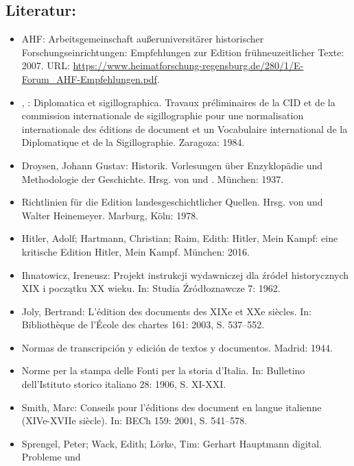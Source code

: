 \documentclass{article}
\begin{document}
        \subsection*{Literatur:}\begin{itemize}\item AHF: Arbeitsgemeinschaft außeruniversitärer historischer
                              Forschungseinrichtungen: Empfehlungen zur Edition frühneuzeitlicher
                              Texte: 2007. URL: \url{https://www.heimatforschung-regensburg.de/280/1/E-Forum_AHF-Empfehlungen.pdf}.\item , : Diplomatica et sigillographica. Travaux préliminaires de
                              la CID et de la commission internationale de sigillographie pour une
                              normalisation internationale des éditions de document et un
                              Vocabulaire international de la Diplomatique et de la
                              Sigillographie. Zaragoza: 1984.\item Droysen, Johann Gustav: Historik. Vorlesungen über Enzyklopädie und Methodologie
                              der Geschichte. Hrsg. von  und  . München: 1937.\item Richtlinien für die Edition landesgeschichtlicher
                              Quellen. Hrsg. von  und Walter Heinemeyer. Marburg, Köln: 1978.\item Hitler, Adolf; Hartmann, Christian; Raim, Edith: Hitler, Mein Kampf: eine kritische Edition Hitler, Mein Kampf. München: 2016.\item Ihnatowicz, Ireneusz: Projekt instrukcji wydawniczej dla źródeł historycznych
                              XIX i początku XX wieku. In: Studia Źródłoznawcze 7: 1962.\item Joly, Bertrand: L’édition des documents des XIXe et XXe siècles. In: Bibliothèque de l'École des chartes 161: 2003, S. 537–552.\item Normas de transcripción y edición de textos y
                              documentos. Madrid: 1944.\item Norme per la stampa delle Fonti per la storia
                              d'Italia. In: Bulletino dell'Istituto storico italiano 28: 1906, S. XI-XXI.\item Smith, Marc: Conseils pour l'éditions des document en langue
                              italienne (XIVe-XVIIe siècle). In: BECh 159: 2001, S. 541–578.\item Sprengel, Peter; Wack, Edith; Lörke, Tim: Gerhart Hauptmann digital. Probleme und

\end{itemize}
\end{document}
